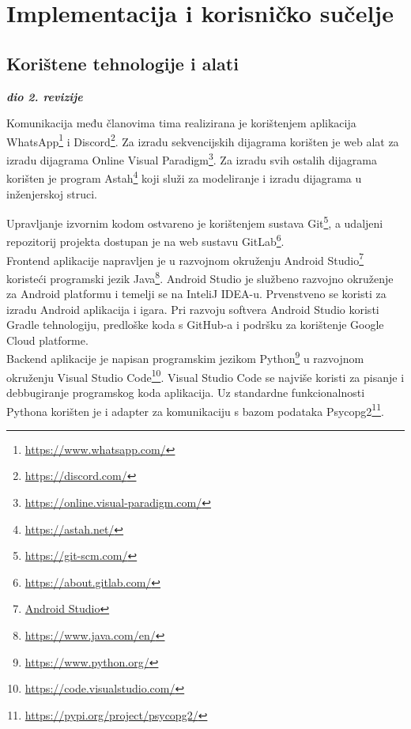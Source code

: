 \chapter{Implementacija i korisničko sučelje}
		
		
		\section{Korištene tehnologije i alati}
		
			\textbf{\textit{dio 2. revizije}}
			
			Komunikacija među članovima tima realizirana je korištenjem aplikacija WhatsApp\footnote{\href{https://www.whatsapp.com/}{https://www.whatsapp.com/}} i Discord\footnote{\href{https://discord.com/}{https://discord.com/}}. Za izradu sekvencijskih dijagrama korišten je web alat za izradu dijagrama Online Visual Paradigm\footnote{\href{https://online.visual-paradigm.com/}{https://online.visual-paradigm.com/}}. Za izradu svih ostalih dijagrama korišten je program Astah\footnote{\href{https://astah.net/}{https://astah.net/}} koji služi za modeliranje i izradu dijagrama u inženjerskoj struci.
			
			Upravljanje izvornim kodom ostvareno je korištenjem sustava Git\footnote{\href{https://git-scm.com/}{https://git-scm.com/}}, a udaljeni repozitorij projekta dostupan je na web sustavu GitLab\footnote{\href{https://about.gitlab.com/}{https://about.gitlab.com/}}.\\
			
			Frontend aplikacije napravljen je u razvojnom okruženju Android Studio\footnote{\href{https://developer.android.com/studio?gclid=CjwKCAiA24SPBhB0EiwAjBgkhjQMRvsHMZCuxfC4b_03_6rtMeVgpqzEHRJTu-w7eo0ddFUCdb-aWBoC-C8QAvD_BwE&gclsrc=aw.ds}{Android Studio}} koristeći programski jezik Java\footnote{\href{https://www.java.com/en/}{https://www.java.com/en/}}. Android Studio je službeno razvojno okruženje za Android platformu i temelji se na InteliJ IDEA-u. Prvenstveno se koristi za izradu Android aplikacija i igara. Pri razvoju softvera Android Studio koristi Gradle tehnologiju, predloške koda s GitHub-a i podršku za korištenje Google Cloud platforme.\\ 
			
			Backend aplikacije je napisan programskim jezikom Python\footnote{\href{https://www.python.org/}{https://www.python.org/}} u razvojnom okruženju Visual Studio Code\footnote{\href{https://code.visualstudio.com/}{https://code.visualstudio.com/}}. Visual Studio Code se najviše koristi za pisanje i debbugiranje programskog koda aplikacija. Uz standardne funkcionalnosti Pythona korišten je i adapter za komunikaciju s bazom podataka Psycopg2\footnote{\href{https://pypi.org/project/psycopg2/}{https://pypi.org/project/psycopg2/}}.\\
			
